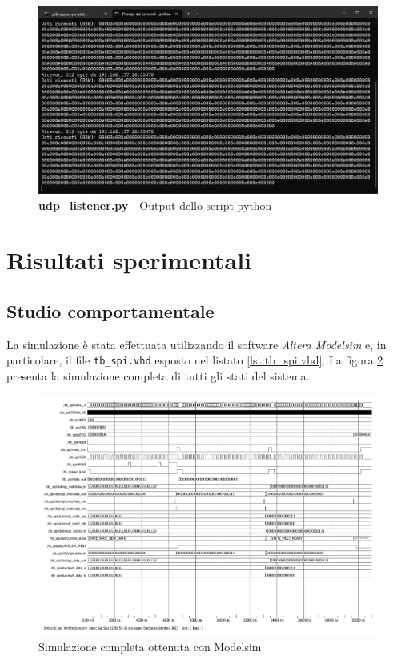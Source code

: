 \documentclass[titlepage]{report}
\begin{document}
	\begin{figure}[H]
		\centering
		\includegraphics[scale=0.55]{./img/output_python.png}
		\caption{\textbf{udp\_listener.py} - Output dello script python}
		\label{fig:udp_listener_output}
	\end{figure}
	
\chapter*{Risultati sperimentali}
\label{ch:risultati_sperimentali}

	\section*{Studio comportamentale}
	\label{sec:studio_comportamentale}
		La simulazione è stata effettuata utilizzando il software \textit{Altera Modelsim} e, in particolare, il file \texttt{tb\_spi.vhd} esposto nel listato \ref{lst:tb_spi.vhd}.
		La figura \ref*{fig:modelsim_sim_completa} presenta la simulazione completa di tutti gli stati del sistema.

		\begin{figure}[H]
			\centering
			\includegraphics[scale=0.5]{./img/simulation.pdf}
			\caption{Simulazione completa ottenuta con Modelsim}
			\label{fig:modelsim_sim_completa}
		\end{figure}
\end{document}

